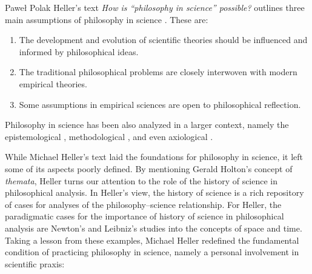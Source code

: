 \begin{artengenv}{Paweł Polak}
Heller’s text \textit{How is ``philosophy in science'' possible?} outlines three main assumptions of philosophy in science
\parencite[p.\pageref{heller-three-points}]{pol_heller_how_2019}.
These are:

\begin{enumerate}[label=(\alph*)]
\item The development and evolution of scientific theories should be influenced and informed by philosophical ideas.
\item The traditional philosophical problems are closely interwoven with modern empirical theories.
\item Some assumptions in empirical sciences are open to philosophical reflection.
\end{enumerate}

Philosophy in science has been also analyzed in a larger context, namely the epistemological
\parencite{pol_heller_epistemologiczne_1987},
methodological
\parencite{pol_zycinski_structure_1988},
and even axiological
\parencites{pol_mcmullin_values_1982}[see also][]{pol_rodzen_w_1999}.

While Michael Heller’s text laid the foundations for philosophy in science, it left some of its aspects poorly defined.
By mentioning Gerald Holton’s concept of \textit{themata}, Heller turns our attention to the role of the history of
science in philosophical analysis. In Heller’s view, the history of science is a rich repository of cases for analyses
of the philosophy–science relationship. For Heller, the paradigmatic cases for the importance of history of science in
philosophical analysis are Newton’s and Leibniz’s studies into the concepts of space and time. Taking a lesson from
these examples, Michael Heller redefined the fundamental condition of practicing philosophy in science, namely a
personal involvement in scientific praxis:



\end{artengenv}
